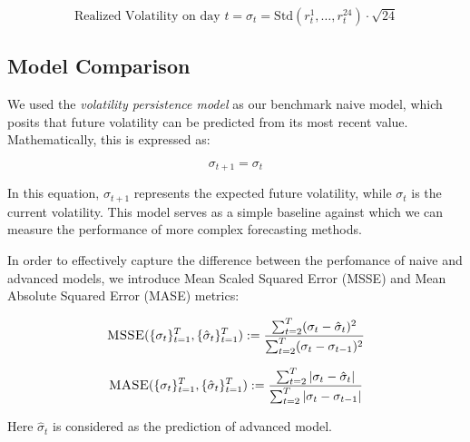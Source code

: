 \begin{equation}
    \text{Realized Volatility on day } t = \sigma_t = \text{Std}(r_t^1, \ldots, r_t^{24}) \cdot \sqrt{24}
\end{equation}

\subsection{Model Comparison}
We used the \textit{volatility persistence model} as our benchmark naive model, which posits that future volatility can be predicted from its most recent value. Mathematically, this is expressed as:

\begin{equation}
    \sigma_{t+1} = \sigma_{t}
\end{equation}

In this equation, \(\sigma_{t+1}\) represents the expected future volatility, while \(\sigma_{t}\) is the current volatility. This model serves as a simple baseline against which we can measure the performance of more complex forecasting methods.

In order to effectively capture the difference between the perfomance of naive and advanced models, we introduce Mean Scaled Squared Error (MSSE) and Mean Absolute Squared Error (MASE) metrics:

\begin{equation}
    \textsc{MSSE}(\{\sigma_t\}_{t=1}^T, \{\hat{\sigma}_t\}_{t=1}^T) := \frac{\sum_{t=2}^T (\sigma_t - \hat{\sigma}_t)^2}{\sum_{t=2}^T (\sigma_t - \sigma_{t-1})^2}
\end{equation}

\begin{equation}
    \textsc{MASE}(\{\sigma_t\}_{t=1}^T, \{\hat{\sigma}_t\}_{t=1}^T) := \frac{\sum_{t=2}^T |\sigma_t - \hat{\sigma}_t|}{\sum_{t=2}^T |\sigma_t - \sigma_{t-1}|}
\end{equation}

Here $\hat{\sigma}_t$ is considered as the prediction of advanced model.